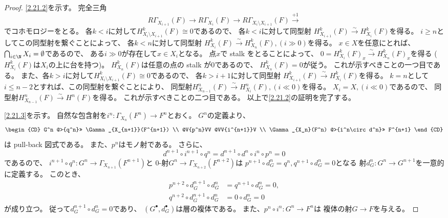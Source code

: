 \documentclass[uplatex,dvipdfmx]{jsarticle}
\begin{document}
\begin{proof}
  \ref{2.21.2}を示す。
  完全三角
  \[
  R\Gamma_{X_{i+1}}(F) \to R\Gamma_{X_i}(F) \to
  R\Gamma_{X_i\setminus X_{i+1}}(F) \xrightarrow{+1}
  \]
  でコホモロジーをとる。
  各\(k < i\)に対して\(H^k_{X_i\setminus X_{i+1}}(F)\cong 0\)であるので、
  各\(k < i\)に対して同型射
  \(H^k_{X_{i+1}}(F) \xrightarrow{\sim} H^k_{X_i}(F)\)を得る。
  \(i\geq n\)としてこの同型射を繋ぐことによって、
  各\(k < n\)に対して同型射
  \(H^k_{X_i}(F) \xrightarrow{\sim} H^k_{X_n}(F), (i \gg 0)\)を得る。
  \(x\in X\)を任意にとれば、
  \(\bigcap_{i\in \N}X_i = \emptyset\)であるので、
  ある\(i\gg 0\)が存在して\(x\in X_i\)となる。
  点\(x\)で stalk をとることによって、
  \(0 = H^k_{X_i}(F)_x \xrightarrow{\sim} H^k_{X_n}(F)_x\)を得る
  (\(H^k_{X_i}(F)\)は\(X_i\)の上に台を持つ)。
  \(H^k_{X_n}(F)\)は任意の点の stalk が\(0\)であるので、
  \(H^k_{X_n}(F) = 0\)が従う。
  これが示すべきことの一つ目である。
  また、各\(k > i\)に対して\(H^k_{X_i\setminus X_{i+1}}(F)\cong 0\)であるので、
  各\(k > i+1\)に対して同型射
  \(H^k_{X_{i+1}}(F) \xrightarrow{\sim} H^k_{X_i}(F)\)を得る。
  \(k=n\)として\(i\leq n-2\)とすれば、この同型射を繋ぐことにより、
  同型射\(H^n_{X_{n-1}}(F) \xrightarrow{\sim} H^n_{X_i}(F), (i\ll 0)\)を得る。
  \(X_i = X, (i\ll 0)\)であるので、
  同型射\(H^n_{X_{n-1}}(F) \xrightarrow{\sim} H^n(F)\)を得る。
  これが示すべきことの二つ目である。
  以上で\ref{2.21.2}の証明を完了する。

  \ref{2.21.3}を示す。
  自然な包含射を\(i^n:\Gamma_{X_n}(F^n) \to F^n\)とおく。
  \(G^n\)の定義より、
  \[
  \begin{CD}
    G^n @>{q^n}>> \Gamma_{X_{n+1}}(F^{n+1}) \\
    @V{p^n}VV @VV{i^{n+1}}V \\
    \Gamma_{X_n}(F^n) @>{i^n\circ d^n}>> F^{n+1}
  \end{CD}
  \]
  は pull-back 図式である。
  また、\(p^n\)はモノ射である。
  さらに、
  \[
  d^{n+1}\circ i^{n+1}\circ q^n
  = d^{n+1}\circ d^n \circ i^n \circ p^n
  = 0
  \]
  であるので、
  \(i^{n+1}\circ q^n:G^n \to \Gamma_{X_{n+1}}(F^{n+1})\)と
  \(0\)-射\(G^n\to \Gamma_{X_{n+2}}(F^{n+2})\)は
  \(p^{n+1}\circ d_G^n = q^n, q^{n+1}\circ d_G^n=0\)となる
  射\(d_G^n:G^n\to G^{n+1}\)を一意的に定義する。
  このとき、
  \begin{align*}
    p^{n+2}\circ d_G^{n+1}\circ d_G^n
    &= q^{n+1}\circ d_G^n = 0, \\
    q^{n+2}\circ d_G^{n+1}\circ d_G^n
    &= 0\circ d_G^n = 0
  \end{align*}
  が成り立つ。
  従って\(d_G^{n+1}\circ d_G^n = 0\)であり、
  \((G^{\bullet},d_G^{\bullet})\)は層の複体である。
  また、\(p^n\circ i^n : G^n\to F^n\)は
  複体の射\(G\to F\)を与える。


\end{proof}
\end{document}
